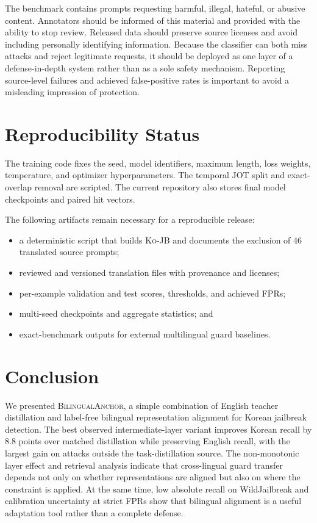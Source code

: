 \documentclass[10pt,twocolumn]{article}
\newcommand{\method}{\textsc{BilingualAnchor}}
\newcommand{\dataset}{\textsc{Ko-JB}}
\begin{document}
The benchmark contains prompts requesting harmful, illegal, hateful, or abusive
content. Annotators should be informed of this material and provided with the
ability to stop review. Released data should preserve source licenses and avoid
including personally identifying information. Because the classifier can both
miss attacks and reject legitimate requests, it should be deployed as one layer
of a defense-in-depth system rather than as a sole safety mechanism. Reporting
source-level failures and achieved false-positive rates is important to avoid a
misleading impression of protection.

\section{Reproducibility Status}

The training code fixes the seed, model identifiers, maximum length, loss
weights, temperature, and optimizer hyperparameters. The temporal JOT split and
exact-overlap removal are scripted. The current repository also stores final
model checkpoints and paired hit vectors.

The following artifacts remain necessary for a reproducible release:
\begin{itemize}
    \item a deterministic script that builds \dataset{} and documents the
    exclusion of 46 translated source prompts;
    \item reviewed and versioned translation files with provenance and licenses;
    \item per-example validation and test scores, thresholds, and achieved FPRs;
    \item multi-seed checkpoints and aggregate statistics; and
    \item exact-benchmark outputs for external multilingual guard baselines.
\end{itemize}

\section{Conclusion}

We presented \method, a simple combination of English teacher distillation and
label-free bilingual representation alignment for Korean jailbreak detection.
The best observed intermediate-layer variant improves Korean recall by 8.8
points over matched distillation while preserving English recall, with the
largest gain on attacks outside the task-distillation source. The non-monotonic
layer effect and retrieval analysis indicate that cross-lingual guard transfer
depends not only on whether representations are aligned but also on where the
constraint is applied. At the same time, low absolute recall on WildJailbreak
and calibration uncertainty at strict FPRs show that bilingual alignment is a
useful adaptation tool rather than a complete defense.
\end{document}
